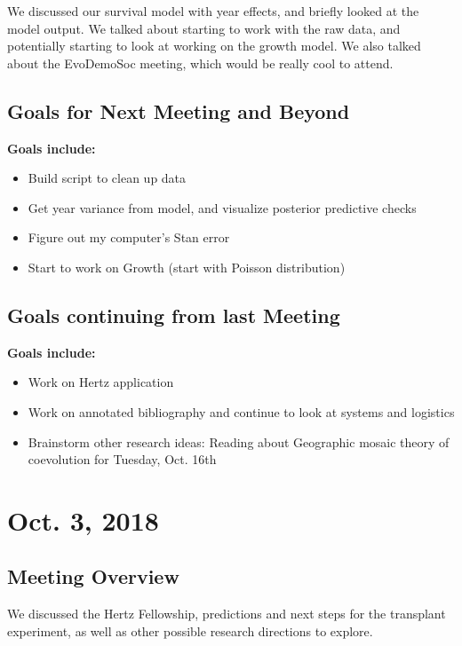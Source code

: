 \documentclass{article}
\newcommand{\tom}[1]{{\textit{\color{WildStrawberry}{[#1]}}}}
\begin{document}
We discussed our survival model with year effects, and briefly looked at the model output. We talked about starting to work with the raw data, and potentially starting to look at working on the growth model. We also talked about the EvoDemoSoc meeting, which would be really cool to attend.

\subsection*{Goals for Next Meeting and Beyond}
\textbf{Goals include:} 
\begin{itemize}
\item{Build script to clean up data}
\item{Get year variance from model, and visualize posterior predictive checks}
\item{Figure out my computer's Stan error}
\item{Start to work on Growth (start with Poisson distribution) \tom{When you are ready for it, I can share an example of negative binomial growth modeling in Stan.}}
\end{itemize}

\subsection*{Goals continuing from last Meeting}
\textbf{Goals include:} 
\begin{itemize}
\item{Work on Hertz application}
\item{Work on annotated bibliography and continue to look at systems and logistics \tom{See comment on same point below}}
\item{Brainstorm other research ideas: Reading about Geographic mosaic theory of coevolution for Tuesday, Oct. 16th}
\end{itemize}


\section*{Oct. 3, 2018}
\tom{I made the notes below before pulling some of the more recent meeting notes - sorry. Some of these are not as relevant given your points above.}
\subsection*{Meeting Overview}

We discussed the Hertz Fellowship, predictions and next steps for the transplant experiment, as well as other possible research directions to explore.
\end{document}
